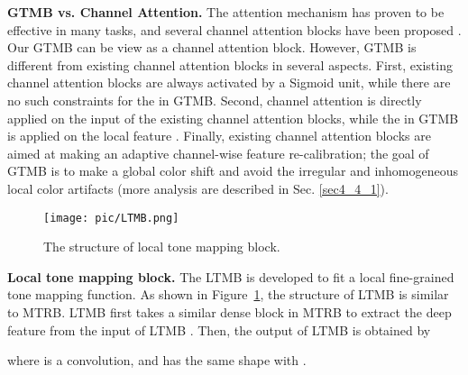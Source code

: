 \documentclass[10pt,twocolumn,letterpaper]{article}
\begin{document}
\textbf{GTMB vs. Channel Attention.} The attention mechanism has proven to be effective in many tasks\cite{yan2019stat,wang2019edvr,yan2020TPMAI, 3droom}, and several channel attention blocks have been proposed \cite{rcan, hu2018squeeze}. Our GTMB can be view as a channel attention block.
However, GTMB is different from existing channel attention blocks in several aspects. 
First, existing channel attention blocks are always activated by a Sigmoid unit, while there are no such constraints for the  in GTMB. 
Second, channel attention is directly applied on the input of the existing channel attention blocks,  while the  in GTMB is applied on the local feature .
Finally, existing channel attention blocks are aimed at making an adaptive channel-wise feature re-calibration; the goal of GTMB is to make a global color shift and avoid the irregular and inhomogeneous local color artifacts (more analysis are described in Sec. \ref{sec4_4_1}).
\begin{comment}
\begin{table}
	\begin{center}
		\begin{tabular}{|l|c|c|c|}
			\hline
			Layer & Stride & Kernel & Output Ch. \\
			\hline\hline
			 &  &  & \\
			 &  &  & \\
			 &  &  & \\
			 & - & - & \\
			 & - & - & \\
			 & - & - & \\
			\hline
		\end{tabular}
	\end{center}
	\caption{Attributions of learnable layers in GTMB.}
	\label{table1}
\end{table}
\end{comment}


\begin{figure}[t]
	\centering
	\texttt{[image: pic/LTMB.png]}
	\caption{The structure of local tone mapping block.}
	\label{LTMB}
\end{figure}
\textbf{Local tone mapping block.} 
The LTMB is developed to fit a local fine-grained tone mapping function. 
As shown in Figure~\ref{LTMB}, the structure of LTMB is similar to MTRB. 
LTMB first takes a similar dense block in MTRB to extract the deep feature  from the input of LTMB . 
Then, the output of LTMB is obtained by 

where  is a  convolution, and  has the same shape with .
\end{document}
